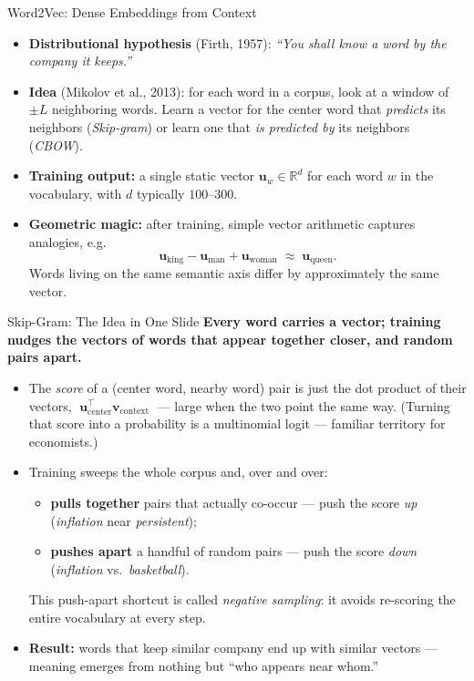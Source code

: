 \begin{frame}{Word2Vec: Dense Embeddings from Context}
\begin{itemize}
\item \textbf{Distributional hypothesis} (Firth, 1957): \emph{``You shall know a word by the company it keeps.''}

\medskip
\item \textbf{Idea} (Mikolov et al., 2013): for each word in a corpus, look at a window of $\pm L$ neighboring words. Learn a vector for the center word that \emph{predicts} its neighbors (\emph{Skip-gram}) or learn one that \emph{is predicted by} its neighbors (\emph{CBOW}).

\medskip
\item \textbf{Training output:} a single static vector $\mathbf{u}_w \in \mathbb{R}^{d}$ for each word $w$ in the vocabulary, with $d$ typically $100$--$300$.

\medskip
\item \textbf{Geometric magic:} after training, simple vector arithmetic captures analogies, e.g.
\[
   \mathbf{u}_{\text{king}} - \mathbf{u}_{\text{man}} + \mathbf{u}_{\text{woman}} \;\approx\; \mathbf{u}_{\text{queen}}.
\]
Words living on the same semantic axis differ by approximately the same vector.
\end{itemize}
\end{frame}

\begin{frame}{Skip-Gram: The Idea in One Slide}
\textbf{Every word carries a vector; training nudges the vectors of words that appear together closer, and random pairs apart.}
\medskip
\begin{itemize}
\item The \emph{score} of a (center word, nearby word) pair is just the dot product of their vectors, $\;\mathbf{u}_{\text{center}}^{\top}\mathbf{v}_{\text{context}}\;$ --- large when the two point the same way. (Turning that score into a probability is a multinomial logit --- familiar territory for economists.)
\medskip
\item Training sweeps the whole corpus and, over and over:
\begin{itemize}
    \item \textbf{pulls together} pairs that actually co-occur --- push the score \emph{up} (\emph{inflation} near \emph{persistent});
    \item \textbf{pushes apart} a handful of random pairs --- push the score \emph{down} (\emph{inflation} vs.\ \emph{basketball}).
\end{itemize}
This push-apart shortcut is called \emph{negative sampling}: it avoids re-scoring the entire vocabulary at every step.
\medskip
\item \textbf{Result:} words that keep similar company end up with similar vectors --- meaning emerges from nothing but ``who appears near whom.''
\end{itemize}
\end{frame}

